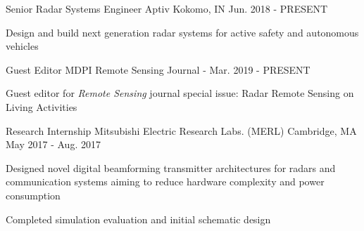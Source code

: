 
\begin{cventries}

  \cventry
    {Senior Radar Systems Engineer} %
    {Aptiv} %
    {Kokomo, IN} %
    {Jun. 2018 - PRESENT} %
    {
      \begin{cvitems} %
        \item {Design and build next generation radar systems for active safety and autonomous vehicles}
      \end{cvitems}
    }
    
  \cventry
    {Guest Editor} %
    {MDPI Remote Sensing Journal} %
    {-} %
    {Mar. 2019 - PRESENT} %
    {
      \begin{cvitems} %
        \item {Guest editor for {\em{Remote Sensing}} journal special issue: Radar Remote Sensing on Living Activities}
      \end{cvitems}
    }

  \cventry
    {Research Internship} %
    {Mitsubishi Electric Research Labs. (MERL)} %
    {Cambridge, MA} %
    {May 2017 - Aug. 2017} %
    {
      \begin{cvitems} %
        \item {Designed novel digital beamforming transmitter architectures for radars and communication systems aiming to reduce hardware complexity and power consumption}
        \item {Completed simulation evaluation and initial schematic design}
      \end{cvitems}
    }

\end{cventries}
